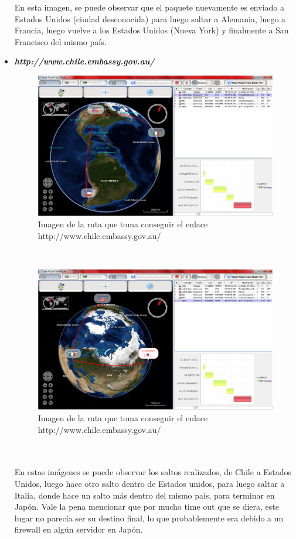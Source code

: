 \documentclass[a4paper,10pt]{article}
\begin{document}
\begin{itemize}
En esta imagen, se puede observar que el paquete nuevamente es enviado a Estados Unidos (ciudad desconocida) para luego saltar a Alemania, luego a Francia, luego vuelve a los Estados Unidos (Nueva York) y finalmente a San Francisco del mismo país.\\
 \item \textbf{\textsl{http://www.chile.embassy.gov.au/}}\\

\begin{figure}[H]
\centering
\includegraphics[height=8 cm]{imagenes/enlace51.png}
\caption{Imagen de la ruta que toma conseguir el enlace http://www.chile.embassy.gov.au/ }
\end{figure} \\ 

\begin{figure}[H]
\centering
\includegraphics[height=8 cm]{imagenes/enlace52.png}
\caption{Imagen de la ruta que toma conseguir el enlace http://www.chile.embassy.gov.au/ }
\end{figure} \\ \\


En estas imágenes se puede observar los saltos realizados, de Chile a Estados Unidos, luego hace otro salto dentro de Estados unidos, para luego saltar a Italia, donde hace un salto más dentro del mismo país, para terminar en Japón. Vale la pena mencionar que por mucho time out que se diera, este lugar no parecía ser su destino final, lo que probablemente era debido a un firewall en algún servidor en Japón.\\

\end{itemize}
\end{document}
